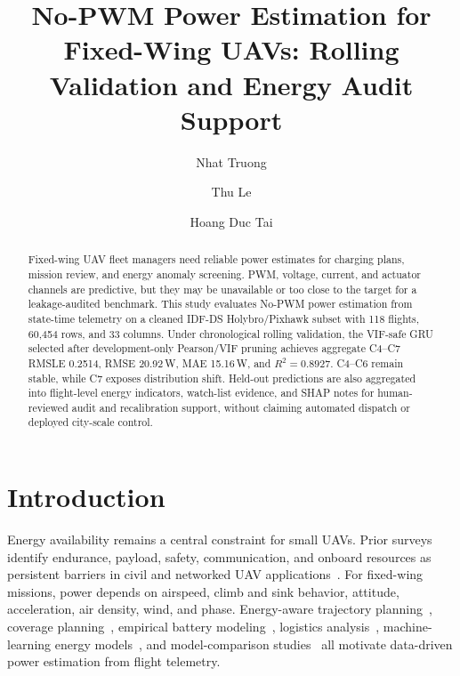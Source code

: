 \documentclass[runningheads,a4paper]{llncs}
\begin{document}
\title{No-PWM Power Estimation for Fixed-Wing UAVs: Rolling Validation and Energy Audit Support}


\author{Nhat Truong \and Thu Le \and Hoang Duc Tai}



\maketitle

\begin{abstract}
Fixed-wing UAV fleet managers need reliable power estimates for charging plans, mission review, and energy anomaly screening. PWM, voltage, current, and actuator channels are predictive, but they may be unavailable or too close to the target for a leakage-audited benchmark. This study evaluates No-PWM power estimation from state-time telemetry on a cleaned IDF-DS Holybro/Pixhawk subset with 118 flights, 60,454 rows, and 33 columns. Under chronological rolling validation, the VIF-safe GRU selected after development-only Pearson/VIF pruning achieves aggregate C4--C7 RMSLE 0.2514, RMSE 20.92\,W, MAE 15.16\,W, and $R^2=0.8927$. C4--C6 remain stable, while C7 exposes distribution shift. Held-out predictions are also aggregated into flight-level energy indicators, watch-list evidence, and SHAP notes for human-reviewed audit and recalibration support, without claiming automated dispatch or deployed city-scale control.

\end{abstract}

\section{Introduction}

Energy availability remains a central constraint for small UAVs. Prior surveys identify endurance, payload, safety, communication, and onboard resources as persistent barriers in civil and networked UAV applications~\cite{shakhatreh2019survey,mozaffari2019tutorial,hayat2016survey}. For fixed-wing missions, power depends on airspeed, climb and sink behavior, attitude, acceleration, air density, wind, and phase. Energy-aware trajectory planning~\cite{zeng2017energy}, coverage planning~\cite{difranco2016coverage}, empirical battery modeling~\cite{abeywickrama2018access}, logistics analysis~\cite{stolaroff2018drone}, machine-learning energy models~\cite{gora2022ml}, and model-comparison studies~\cite{zhang2021models} all motivate data-driven power estimation from flight telemetry.
\end{document}
